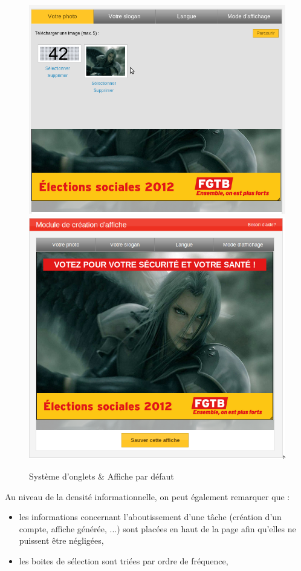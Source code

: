 \documentclass{article}
\begin{document}
\begin{sffamily}
\begin{figure}[h!]
	\begin{center}
		\includegraphics[scale=0.31]{ergo_017.png}
		\includegraphics[scale=0.3]{ergo_008.png}
		\caption{Système d'onglets \& Affiche par défaut}
	\end{center}
\end{figure}

Au niveau de la densité informationnelle, on peut également remarquer que :
\begin{itemize}
\item les informations concernant l'aboutissement d'une tâche (création d'un compte, affiche générée, ...) sont placées en haut de la page afin 
qu'elles ne puissent être négligées,
\item les boites de sélection sont triées par ordre de fréquence,
\end{itemize}


\end{sffamily}
\end{document}
